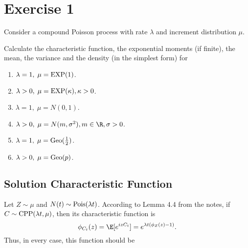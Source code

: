 \section{Exercise 1}

Consider a compound Poisson process with rate $\lambda$ and increment distribution $\mu$.

Calculate the characteristic function, the exponential moments (if finite), the mean, the variance and the density (in the simplest form) for

\begin{enumerate}[label=(\alph*)]
    \item $\lambda = 1,\; \mu = \hbox{EXP}(1)$.
    \item $\lambda > 0,\; \mu = \hbox{EXP}(\kappa), \kappa > 0$.
    \item $\lambda = 1,\; \mu = N(0,1)$.
    \item $\lambda > 0,\; \mu = N(m,\sigma^2), m\in\R, \sigma > 0$.
    \item $\lambda = 1,\; \mu = \hbox{Geo}(\tfrac{1}{2})$.
    \item $\lambda > 0,\; \mu = \hbox{Geo}(p)$.
\end{enumerate}

\subsection*{Solution Characteristic Function}

Let $Z\sim \mu$ and $N(t) \sim \hbox{Pois}(\lambda t)$. According to Lemma 4.4 from the notes, if $C \sim \hbox{CPP}(\lambda t, \mu)$, then its characteristic function is
\[ \phi_{C_t}(z) = \E[e^{iz C_t}] = e^{\lambda t(\phi_Z(z) - 1)}. \]
Thus, in every case, this function should be


